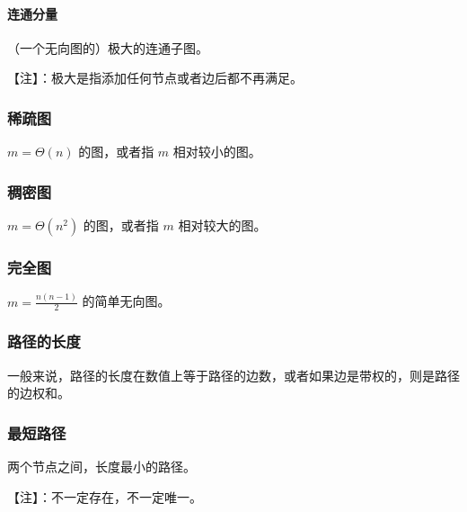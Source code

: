 \paragraph{连通分量}

（一个无向图的）极大的连通子图。

【注】：极大是指添加任何节点或者边后都不再满足。

\subsubsection{稀疏图}

$m = \Theta(n)$ 的图，或者指 $m$ 相对较小的图。

\subsubsection{稠密图}

$m = \Theta(n^2)$ 的图，或者指 $m$ 相对较大的图。

\subsubsection{完全图}

$m = \frac{n(n-1)}{2}$ 的简单无向图。

\subsubsection{路径的长度}

一般来说，路径的长度在数值上等于路径的边数，或者如果边是带权的，则是路径的边权和。

\subsubsection{ 最短路径 }

两个节点之间，长度最小的路径。

【注】：不一定存在，不一定唯一。
